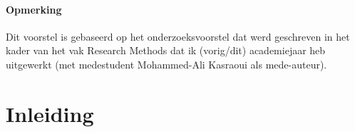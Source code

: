 

\paragraph{Opmerking}
Dit voorstel is gebaseerd op het onderzoeksvoorstel dat werd geschreven in het
kader van het vak Research Methods dat ik (vorig/dit) academiejaar heb
uitgewerkt (met medestudent Mohammed-Ali Kasraoui als mede-auteur).
 
\section{Inleiding}%
\label{sec:inleiding}


%



